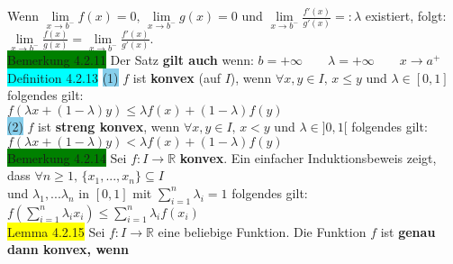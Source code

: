 \documentclass[10pt]{article}
\begin{document}
                Wenn \textcolor{NavyBlue}{
                $\lim\limits_{x\to b^{-}}f(x)=0,\,\lim\limits_{x\to b^{-}}g(x)=0$}
                und 
                \textcolor{NavyBlue}{$\lim\limits_{x\to b^{-}}\frac{f'(x)}{g'(x)}=:\lambda$}
                existiert, folgt: \\
        \indent \textcolor{NavyBlue}{
                $\lim\limits_{x\to b^{-}}\frac{f(x)}{g(x)}
                =\lim\limits_{x\to b^{-}}\frac{f'(x)}{g'(x)}$}.\\
\colorbox{green}{Bemerkung 4.2.11} Der Satz \textbf{gilt auch} wenn: 
                \qquad
                \textcolor{NavyBlue}{$b=+\infty\qquad\lambda=+\infty\qquad x\to a^{+}$}\\
\colorbox{cyan}{Definition 4.2.13} \colorbox{SkyBlue}{(1)} \textcolor{NavyBlue}{$f$}
                ist \textbf{konvex} (auf \textcolor{NavyBlue}{$I$}), wenn 
                \textcolor{NavyBlue}{$\forall x,y\in I,\,x\leqslant y$ und $\lambda\in[0,1]$}
                folgendes gilt: \\
        \indent\indent \textcolor{NavyBlue}{
                $f(\lambda x+(1-\lambda)y)\leqslant\lambda f(x)+(1-\lambda)f(y)$}\\
        \indent \colorbox{SkyBlue}{(2)} \textcolor{NavyBlue}{$f$} ist \textbf{streng konvex}, 
                wenn \textcolor{NavyBlue}{$\forall x,y\in I,\,x<y$}
                und \textcolor{NavyBlue}{$\lambda\in]0,1[$} folgendes gilt: \\
        \indent\indent \textcolor{NavyBlue}{
                $f(\lambda x+(1-\lambda)y)<\lambda f(x)+(1-\lambda)f(y)$} \\
\colorbox{green}{Bemerkung 4.2.14} Sei \textcolor{NavyBlue}{$f:I\longrightarrow\mathbb{R}$} 
                \textbf{konvex}. Ein einfacher Induktionsbeweis zeigt, dass 
                \textcolor{NavyBlue}{$\forall n\geqslant1,\,\{x_1,...,x_n\}\subseteq I$} \\
        \indent und \textcolor{NavyBlue}{$\lambda_1,...\lambda_n$} in 
                \textcolor{NavyBlue}{$[0,1]$} mit 
                \textcolor{NavyBlue}{$\sum_{i=1}^n\lambda_i=1$}
                folgendes gilt: \textcolor{NavyBlue}{
                $f(\sum_{i=1}^n\lambda_i x_i)\leqslant\sum_{i=1}^n\lambda_if(x_i)$}\\
\colorbox{yellow}{Lemma 4.2.15} Sei \textcolor{NavyBlue}{$f:I\longrightarrow\mathbb{R}$} 
                eine beliebige Funktion. Die Funktion \textcolor{NavyBlue}{$f$}
                ist \textbf{genau dann konvex, wenn} \\
\end{document}
